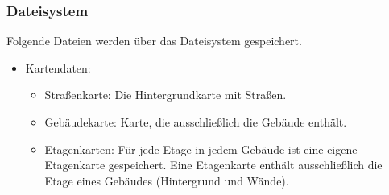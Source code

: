 \subsubsection{Dateisystem}\label{App_DataManagement_Dateisystem}
Folgende Dateien werden über das Dateisystem gespeichert.
\begin{itemize}
    \item Kartendaten:
    \begin{itemize}
        \item Straßenkarte: Die Hintergrundkarte mit Straßen.
        \item Gebäudekarte: Karte, die ausschließlich die Gebäude enthält.
        \item Etagenkarten: Für jede Etage in jedem Gebäude ist eine eigene Etagenkarte gespeichert. 
        Eine Etagenkarte enthält ausschließlich die Etage eines Gebäudes (Hintergrund und Wände).
    \end{itemize}
\end{itemize}